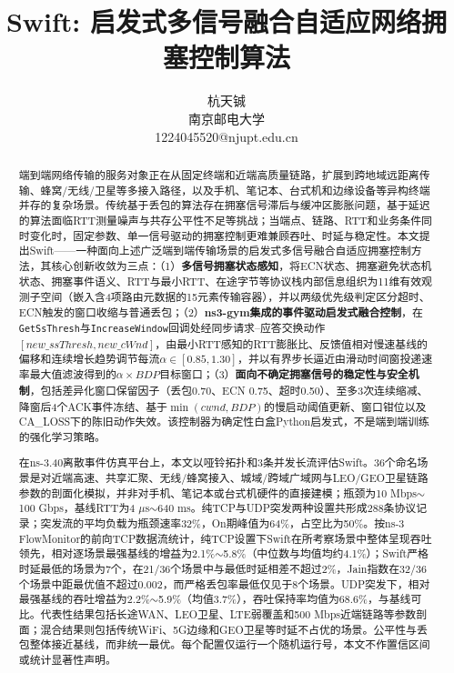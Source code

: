 \documentclass[10pt,twocolumn]{article}
\begin{document}

\title{\Large\textbf{Swift: 启发式多信号融合自适应网络拥塞控制算法}}

\author{
\normalsize 杭天铖 \\
\small 南京邮电大学 \\
\small 1224045520@njupt.edu.cn
}

\date{}

\maketitle


\begin{abstract}
\small
端到端网络传输的服务对象正在从固定终端和近端高质量链路，扩展到跨地域远距离传输、蜂窝/无线/卫星等多接入路径，以及手机、笔记本、台式机和边缘设备等异构终端并存的复杂场景。传统基于丢包的算法存在拥塞信号滞后与缓冲区膨胀问题，基于延迟的算法面临RTT测量噪声与共存公平性不足等挑战；当端点、链路、RTT和业务条件同时变化时，固定参数、单一信号驱动的拥塞控制更难兼顾吞吐、时延与稳定性。本文提出Swift——一种面向上述广泛端到端传输场景的启发式多信号融合自适应拥塞控制方法，其核心创新收敛为三点：（1）\textbf{多信号拥塞状态感知}，将ECN状态、拥塞避免状态机状态、拥塞事件语义、RTT与最小RTT、在途字节等协议栈内部信息组织为11维有效观测子空间（嵌入含4项路由元数据的15元素传输容器），并以两级优先级判定区分超时、ECN触发的窗口收缩与普通丢包；（2）\textbf{ns3-gym集成的事件驱动启发式融合控制}，在\texttt{GetSsThresh}与\texttt{IncreaseWindow}回调处经同步请求--应答交换动作$[new\_ssThresh,new\_cWnd]$，由最小RTT感知的RTT膨胀比、反馈值相对慢速基线的偏移和连续增长趋势调节每流$\alpha\in[0.85,1.30]$，并以有界步长逼近由滑动时间窗投递速率最大值滤波得到的$\alpha\times BDP$目标窗口；（3）\textbf{面向不确定拥塞信号的稳定性与安全机制}，包括差异化窗口保留因子（丢包0.70、ECN 0.75、超时0.50）、至多3次连续缩减、降窗后4个ACK事件冻结、基于$\min(cwnd,BDP)$的慢启动阈值更新、窗口钳位以及CA\_LOSS下的陈旧动作失效。该控制器为确定性白盒Python启发式，不是端到端训练的强化学习策略。

在ns-3.40离散事件仿真平台上，本文以哑铃拓扑和3条并发长流评估Swift。36个命名场景是对近端高速、共享汇聚、无线/蜂窝接入、城域/跨域广域网与LEO/GEO卫星链路参数的剖面化模拟，并非对手机、笔记本或台式机硬件的直接建模；瓶颈为10 Mbps$\sim$100 Gbps，基线RTT为4 $\mu$s$\sim$640 ms。纯TCP与UDP突发两种设置共形成288条协议记录；突发流的平均负载为瓶颈速率32\%，On期峰值为64\%，占空比为50\%。按ns-3 FlowMonitor的前向TCP数据流统计，纯TCP设置下Swift在所考察场景中整体呈现吞吐领先，相对逐场景最强基线的增益为2.1\%$\sim$5.8\%（中位数与均值均约4.1\%）；Swift严格时延最低的场景为7个，在21/36个场景中与最低时延相差不超过2\%，Jain指数在32/36个场景中距最优值不超过0.002，而严格丢包率最低仅见于8个场景。UDP突发下，相对最强基线的吞吐增益为2.2\%$\sim$5.9\%（均值3.7\%），吞吐保持率均值为68.6\%，与基线可比。代表性结果包括长途WAN、LEO卫星、LTE弱覆盖和500 Mbps近端链路等参数剖面；混合结果则包括传统WiFi、5G边缘和GEO卫星等时延不占优的场景。公平性与丢包整体接近基线，而非统一最优。每个配置仅运行一个随机运行号，本文不作置信区间或统计显著性声明。


\end{abstract}
\end{document}
